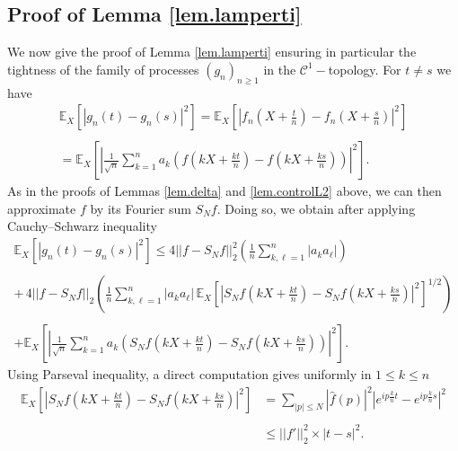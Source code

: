 \documentclass{svproc}
\begin{document}
\subsection{Proof of Lemma \ref{lem.lamperti}}\label{sec.lem.lamperti}
We now give the proof of Lemma \ref{lem.lamperti} ensuring in particular the tightness of the family of processes $(g_n)_{n \geq 1}$ in the $\mathcal C^1-$topology. For $t \neq s$ we have
\[
\begin{array}{ll}
\displaystyle{ \mathbb E_X \left[\left| g_n\left(t \right)-g_n\left(s\right)\right|^2  \right]  =  \mathbb E_X \left[\left| f_n\left(X+\frac{t}{n}\right)-f_n\left(X+\frac{s}{n}\right)\right|^2  \right]} \\
 \\
 \displaystyle{= \mathbb E_X \left[\left| \frac{1}{\sqrt{n}} \sum_{k=1}^n a_k  \left( f\left(kX+\frac{kt}{n}\right)-f\left(kX+\frac{ks}{n}\right)\right)\right|^2  \right]}.
 \end{array}
\]
As in the proofs of Lemmas \ref{lem.delta} and \ref{lem.controlL2} above, we can then approximate $f$ by its Fourier sum $S_Nf$. Doing so, we obtain after applying Cauchy--Schwarz inequality
\[
\begin{array}{ll}
\displaystyle{ \mathbb E_X \left[\left| g_n\left(t \right)-g_n\left(s\right)\right|^2  \right]   \leq   4 ||f-S_Nf||_2^2\left( \frac{1}{n} \sum_{k,\ell=1}^n |a_k a_{\ell}|\right)}\\
\\
\displaystyle{ + \, 4 ||f-S_Nf||_2 \left( \frac{1}{n} \sum_{k,\ell=1}^n |a_k a_{\ell}|\, \mathbb E_X\left[\left| S_N f\left(kX+\frac{kt}{n}\right)-S_N f\left(kX+\frac{ks}{n}\right) \right|^2  \right]^{1/2}\right)}\\
 \\
 \displaystyle{ +\mathbb E_X \left[\left| \frac{1}{\sqrt{n}} \sum_{k=1}^n a_k  \left( S_N f\left(kX+\frac{kt}{n}\right)-S_N f\left(kX+\frac{ks}{n}\right)\right)\right|^2  \right]}.
 \end{array}
\]
Using Parseval inequality, a direct computation gives uniformly in $1\leq k\leq n$
\[
\begin{array}{ll}
 \displaystyle{\mathbb E_X\left[\left| S_N f\left(kX+\frac{kt}{n}\right)-S_N f\left(kX+\frac{ks}{n}\right) \right|^2  \right]} & =  \displaystyle{\sum_{|p|\leq N} |\widehat{f}(p)|^2 \left| e^{ip \frac{k}{n} t} - e^{ip \frac{k}{n} s}\right|^2 }\\
 \\
 &  \displaystyle{\leq ||f'||_2^2 \times |t-s|^2.}
 \end{array}
\]
\end{document}
